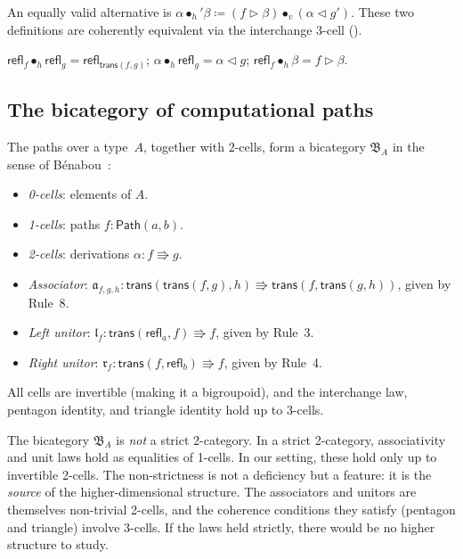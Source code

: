 \documentclass[manuscript]{BSLstyle}
\newcommand{\Path}{\mathsf{Path}}
\newcommand{\refl}{\mathsf{refl}}
\newcommand{\trans}{\mathsf{trans}}
\newcommand{\defeq}{\coloneqq}
\begin{document}
\begin{remark}
An equally valid alternative is
$\alpha \bullet_h' \beta \defeq
(f \triangleright \beta) \bullet_v (\alpha \triangleleft g')$.
These two definitions are coherently equivalent via the interchange
3-cell ().
\end{remark}

\begin{proposition}\label{prop:hcomp-id}
$\refl_f \bullet_h \refl_g = \refl_{\trans(f, g)}$;
$\alpha \bullet_h \refl_g = \alpha \triangleleft g$;
$\refl_f \bullet_h \beta = f \triangleright \beta$.
\end{proposition}

\subsection{The bicategory of computational paths}

\begin{theorem}\label{thm:2-groupoid}
The paths over a type~$A$, together with 2-cells, form a
bicategory $\mathfrak{B}_A$ in the sense of B\'enabou~\cite{Benabou67}:
\begin{itemize}
\item \emph{0-cells}: elements of $A$.
\item \emph{1-cells}: paths $f : \Path(a, b)$.
\item \emph{2-cells}: derivations $\alpha : f \Rrightarrow g$.
\item \emph{Associator}: $\mathfrak{a}_{f,g,h} : \trans(\trans(f,g), h) \Rrightarrow \trans(f, \trans(g, h))$, given by Rule~8.
\item \emph{Left unitor}: $\mathfrak{l}_f : \trans(\refl_a, f) \Rrightarrow f$, given by Rule~3.
\item \emph{Right unitor}: $\mathfrak{r}_f : \trans(f, \refl_b) \Rrightarrow f$, given by Rule~4.
\end{itemize}
All cells are invertible (making it a bigroupoid), and the interchange
law, pentagon identity, and triangle identity hold up to 3-cells.
\end{theorem}

\begin{remark}
The bicategory $\mathfrak{B}_A$ is \emph{not} a strict 2-category.
In a strict 2-category, associativity and unit laws hold as equalities
of 1-cells.  In our setting, these hold only up to invertible 2-cells.
The non-strictness is not a deficiency but a feature: it is the
\emph{source} of the higher-dimensional structure.  The associators and
unitors are themselves non-trivial 2-cells, and the coherence conditions
they satisfy (pentagon and triangle) involve 3-cells.  If the laws held
strictly, there would be no higher structure to study.
\end{remark}
\end{document}
